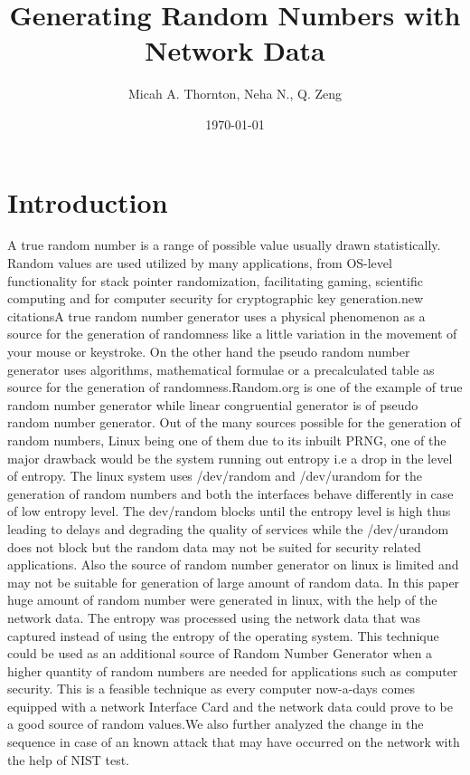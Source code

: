 \documentclass{IEEEtran}
\title{Generating Random Numbers with Network Data}
\author{Micah A. Thornton, Neha N., Q. Zeng}
\date{\today}
\begin{document}
\maketitle{}

\begin{abstract}

\end{abstract} 

\section{Introduction} 
A  true random number is a range of possible value usually drawn statistically. Random values  are used utilized by many applications, from OS-level functionality for stack pointer randomization, facilitating gaming, scientific computing and for computer security for cryptographic key generation.{new citations}A true random number generator uses a physical phenomenon as a source for the generation of randomness like a little variation in the movement of your mouse or keystroke. On the other hand the pseudo random number generator uses algorithms, mathematical formulae or a precalculated table as source for the generation of randomness.Random.org is one of the example of true random number generator while linear congruential generator is of pseudo random number generator.  
Out of the many sources possible for the generation of random numbers,  Linux being one of them due to its inbuilt PRNG,  one of the major drawback  would  be the  system running out entropy i.e a drop in the  level of entropy.  The linux system uses /dev/random and /dev/urandom for the generation of random numbers and both the interfaces behave differently in case of low entropy level. The dev/random blocks until the entropy level is high thus leading to delays and degrading the quality of services while the /dev/urandom does not block but the random data may not be suited for security related applications. Also the source of random number generator on linux is limited and may not be suitable for generation of large amount of random data.  
In this paper huge amount of  random number were generated in linux, with the help of the network data. The entropy was processed using the network data that was captured instead of using the entropy of the operating system. This technique could be used as an additional source of Random Number Generator when a higher quantity of random numbers are needed for applications such as computer security. This is a feasible technique as every computer now-a-days comes equipped with a network Interface Card and the network data could prove to be a good source of random values.We  also  further analyzed the change in the sequence in case of an known attack that may have occurred on the network with the help of NIST test.
\end{document}

